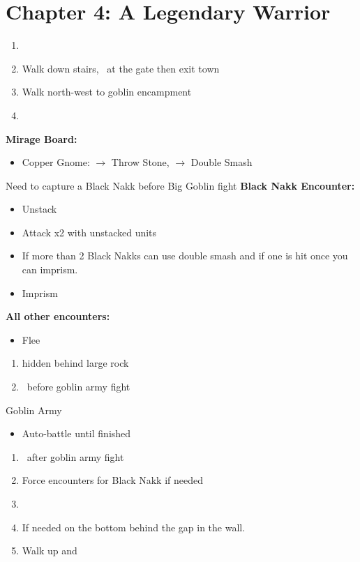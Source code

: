 \chapter{Chapter 4: A Legendary Warrior}
\begin{enumerate}
	\item \cs
	\item Walk down stairs, \cs\ at the gate then exit town
	\item Walk north-west to goblin encampment
	\item \cs
\end{enumerate}
\begin{menu}
	\textbf{Mirage Board:}
	\begin{itemize}
		\item Copper Gnome: $\rightarrow$ Throw Stone, $\rightarrow$ Double Smash
	\end{itemize}
\end{menu}
\begin{encounters}
Need to capture a Black Nakk before Big Goblin fight
\newline
\vspace{\baselineskip}
\textbf{Black Nakk Encounter:}
	\begin{itemize}
		\item Unstack
		\item Attack x2 with unstacked units
		\item If more than 2 Black Nakks can use double smash and if one is hit once you can imprism.
		\item Imprism
	\end{itemize}
\textbf{All other encounters:}
	\begin{itemize}
		\item Flee
	\end{itemize}
\end{encounters}
\begin{enumerate}[resume]
	\item {} hidden behind large rock
	\item \cs\ before goblin army fight
\end{enumerate}
\begin{battle}[]{Goblin Army}
	\begin{itemize}
		\reynnf Attack
		\lannf Double Smash
		\item Auto-battle until finished
	\end{itemize}
\end{battle}
\begin{enumerate}[resume]
	\item \cs\ after goblin army fight
	\item Force encounters for Black Nakk if needed
	\item \save
	\item If needed  on the bottom behind the gap in the wall.
	\item Walk up and \cs
\end{enumerate}
